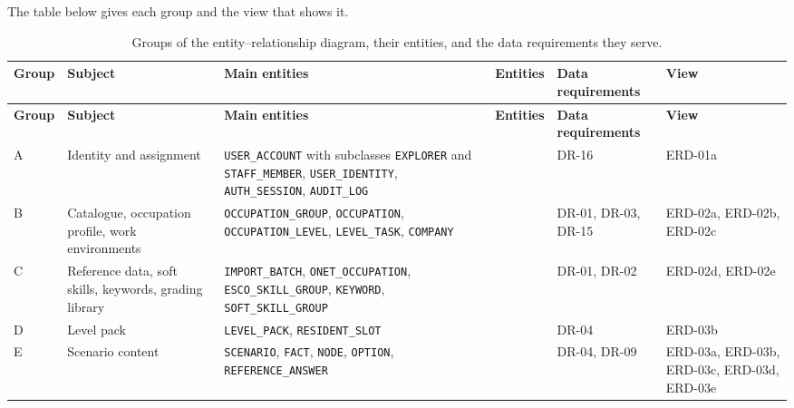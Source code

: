 The table below gives each group and the view that shows it.

{\footnotesize{}\renewcommand{\arraystretch}{1.1}
\begin{longtable}{|>{\raggedright\arraybackslash}p{}|>{\raggedright\arraybackslash}p{}|>{\raggedright\arraybackslash}p{}|>{\raggedright\arraybackslash}p{}|>{\raggedright\arraybackslash}p{}|>{\raggedright\arraybackslash}p{}|}
\caption{Groups of the entity--relationship diagram, their entities, and the data requirements they serve.} \\
\hline
\textbf{Group} & \textbf{Subject} & \textbf{Main entities} & \textbf{Entities} & \textbf{Data requirements} & \textbf{View} \\ \hline
\endfirsthead
\hline
\textbf{Group} & \textbf{Subject} & \textbf{Main entities} & \textbf{Entities} & \textbf{Data requirements} & \textbf{View} \\ \hline
\endhead
A & Identity and assignment & \texttt{USER\_\allowbreak{}ACCOUNT} with subclasses \texttt{EXPLORER} and \texttt{STAFF\_\allowbreak{}MEMBER}, \texttt{USER\_\allowbreak{}IDENTITY}, \texttt{AUTH\_\allowbreak{}SESSION}, \texttt{AUDIT\_\allowbreak{}LOG} & 7 & DR-16 & ERD-01a \\ \hline
B & Catalogue, occupation profile, work environments & \texttt{OCCUPATION\_\allowbreak{}GROUP}, \texttt{OCCUPATION}, \texttt{OCCUPATION\_\allowbreak{}LEVEL}, \texttt{LEVEL\_\allowbreak{}TASK}, \texttt{COMPANY} & 11 & DR-01, DR-03, DR-15 & ERD-02a, ERD-02b, ERD-02c \\ \hline
C & Reference data, soft skills, keywords, grading library & \texttt{IMPORT\_\allowbreak{}BATCH}, \texttt{ONET\_\allowbreak{}OCCUPATION}, \texttt{ESCO\_\allowbreak{}SKILL\_\allowbreak{}GROUP}, \texttt{KEYWORD}, \texttt{SOFT\_\allowbreak{}SKILL\_\allowbreak{}GROUP} & 10 & DR-01, DR-02 & ERD-02d, ERD-02e \\ \hline
D & Level pack & \texttt{LEVEL\_\allowbreak{}PACK}, \texttt{RESIDENT\_\allowbreak{}SLOT} & 2 & DR-04 & ERD-03b \\ \hline
E & Scenario content & \texttt{SCENARIO}, \texttt{FACT}, \texttt{NODE}, \texttt{OPTION}, \texttt{REFERENCE\_\allowbreak{}ANSWER} & 14 & DR-04, DR-09 & ERD-03a, ERD-03b, ERD-03c, ERD-03d, ERD-03e \\ \hline

\end{longtable}}
